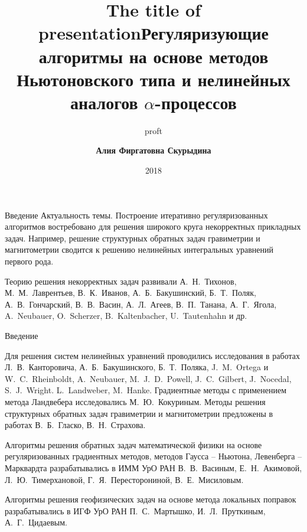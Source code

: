 \documentclass[10pt,pdf, mathserif, hyperref={unicode}]{beamer}
\title{The title of presentation}
\author{proft}
\date{2018}
\begin{document}
	
	\small
	\footnotesize
	
\title[\hspace*{55mm}{\insertpagenumber /\pageref{lastpage}}]{{\small\textbf{Регуляризующие алгоритмы на основе методов 
Ньютоновского типа и нелинейных аналогов $\alpha$-процессов}}}
\author[\insertlogo{\em{Алия Фиргатовна Скурыдина}}%
\hspace*{60mm}]{\textbf{\color{blue}Алия Фиргатовна Скурыдина}}
\frame{\titlepage}

\begin{frame}{Введение}{}
%	
	{\color{blue}Актуальность темы.} Построение итеративно регуляризованных алгоритмов востребовано для решения широкого круга некорректных прикладных задач. Например, решение структурных обратных задач гравиметрии и магнитометрии сводится к решению нелинейных интегральных уравнений первого рода.
	
	\smallskip
	Теорию решения некорректных задач развивали А.~Н.~Тихонов, М.~М.~Лаврентьев, В.~К.~Иванов, А.~Б.~Бакушинский, Б.~Т.~Поляк, А.~В.~Гончарский, В.~В.~Васин, А.~Л.~Агеев, В.~П.~Танана, А.~Г.~Ягола, A.~Neubauer, O.~Scherzer, B.~Kaltenbacher, U.~Tautenhahn и др.
	
\end{frame}
\begin{frame}{Введение}
	
	Для решения систем нелинейных уравнений проводились исследования в работах Л.~В.~Канторовича, А.~Б.~Бакушинского, Б.~Т.~Поляка, J.~M.~Ortega и W.~C.~Rheinboldt,	A.~Neubauer, M.~J.~D.~Powell, 	J.~C.~Gilbert, J.~Nocedal, S.~J.~Wright.
	L.~Landweber, M.~Hanke. Градиентные методы с применением
	метода Ландвебера исследовались М.~Ю.~Кокуриным.
	Методы решения структурных обратных задач гравиметрии и магнитометрии предложены в работах В.~Б.~Гласко, В.~Н.~Страхова. 
	\vspace*{0.3cm}
	
	Алгоритмы решения обратных задач математической физики на основе регуляризованных градиентных методов, 
методов Гаусса -- Ньютона, Левенберга -- Марквардта разрабатывались в ИММ УрО РАН В.~В.~Васиным, Е.~Н.~Акимовой, 
Л.~Ю.~Тимерхановой, Г.~Я.~Пересторониной, В.~Е.~Мисиловым. 

Алгоритмы решения геофизических задач на основе метода локальных поправок разрабатывались в ИГФ УрО РАН 
П.~С.~Мартышко, И.~Л.~Пруткиным, А.~Г.~Цидаевым.  
\end{frame}
\end{document}
